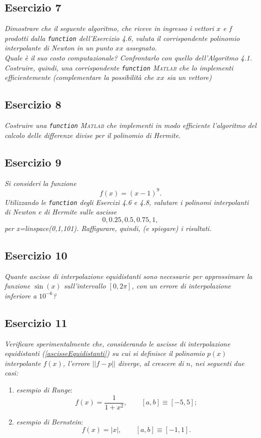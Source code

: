 \subsection{Esercizio 7}
\label{sub:Esercizio 7}
\emph{Dimostrare che il seguente algoritmo, che riceve in ingresso i vettori $x$ e $f$ prodotti dalla \lstinline{function} dell'Esercizio 4.6, valuta il corrispondente polinomio interpolante di Newton in un punto $xx$
assegnato.}\\

\emph{Quale è il suo costo computazionale? Confrontarlo con quello dell'Algoritmo 4.1. Costruire, quindi, una corrispondente \lstinline{function} \textsc{Matlab} che lo implementi efficientemente (complementare la possibilità che $xx$ sia un vettore)}

\subsection{Esercizio 8}
\label{sub:Esercizio 8}
\emph{Costruire una \lstinline{function} \textsc{Matlab} che implementi in modo efficiente l'algoritmo del calcolo delle differenze divise per il polinomio di Hermite.}

\subsection{Esercizio 9}
\label{sub:Esercizio 9}
\emph{Si consideri la funzione
$$f(x)=(x-1)^9.$$
Utilizzando le \lstinline{function} degli Esercizi 4.6 e 4.8, valutare i polinomi interpolanti di Newton e di Hermite sulle ascisse
$$0,0.25,0.5,0.75,1,$$
per x=linspace(0,1,101). Raffigurare, quindi, (e spiegare) i risultati.}

\subsection{Esercizio 10}
\label{sub:Esercizio 10}
\emph{Quante ascisse di interpolazione equidistanti sono necessarie per approssimare la funzione $\sin(x)$ sull'intervallo $[0,2\pi]$, con un errore di interpolazione inferiore a $10^{-6}$?}

\subsection{Esercizio 11}
\label{sub:Esercizio 11}
\emph{Verificare sperimentalmente che, considerando le ascisse di interpolazione equidistanti (\ref{ascisseEquidistanti}) su cui si definisce il polinomio $p(x)$ interpolante $f(x)$, l'errore $||f-p||$ diverge, al crescere di $n$, nei seguenti due casi:}
			\begin{enumerate}
				\item \emph{esempio di Runge}:
					$$f(x)=\frac{1}{1+x^2},\qquad [a,b]\equiv[-5,5];$$
				\item \emph{esempio di Bernstein}:
					$$f(x)=|x|,\qquad [a,b]\equiv[-1,1].$$
			\end{enumerate}

